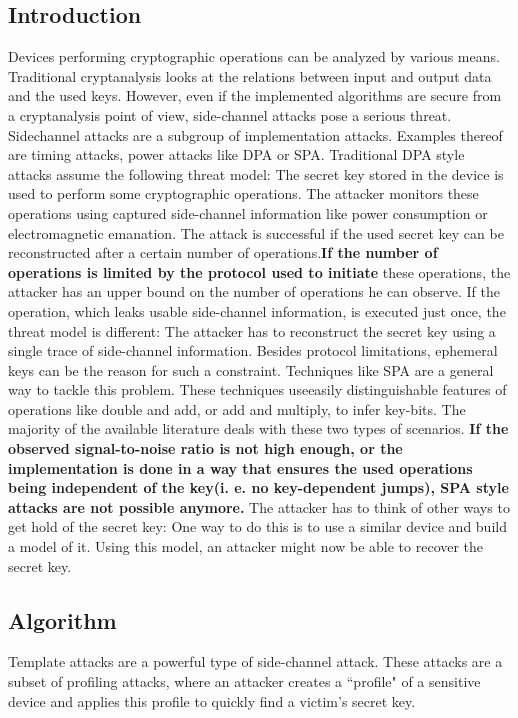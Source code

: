 \subsection{Introduction}
    Devices performing cryptographic operations can be analyzed by various means.
    Traditional cryptanalysis looks at the relations between input and output data and the used keys. However, even if the implemented algorithms are secure from a cryptanalysis point of view, side-channel attacks pose a serious threat. Sidechannel attacks are a subgroup of implementation attacks. Examples thereof are timing attacks, power attacks like DPA or SPA.
    Traditional DPA style attacks assume the following threat model:
    The secret key stored in the device is used to perform some cryptographic operations. The attacker monitors these operations using captured side-channel information like power consumption or electromagnetic emanation. The attack is successful if the used secret key can be reconstructed after a certain number of operations.\textbf{If the number of operations is limited by the protocol used to initiate} these operations, the attacker has an upper bound on the number of operations he can observe. If the operation, which leaks usable side-channel information, is executed just once, the threat model is different: The attacker has to reconstruct the secret
    key using a single trace of side-channel information. Besides protocol limitations, ephemeral keys can be the reason for such a constraint. Techniques like SPA are a general way to tackle this problem. These techniques useeasily distinguishable features of operations like double and add, or add and multiply, to infer key-bits. The majority of the available literature deals with these two types of scenarios. \textbf{If the observed signal-to-noise ratio is not high enough, or the implementation is done in a way that ensures the used operations being independent of the key(i. e. no key-dependent jumps), SPA style attacks are not possible anymore.} The attacker has to think of other ways to get hold of the secret key: One way to do this is to use a similar device and build a model of it. Using this
    model, an attacker might now be able to recover the secret key.
    
\subsection{Algorithm}
    Template attacks are a powerful type of side-channel attack. These attacks are a subset of profiling attacks, where an attacker creates a ``profile" of a sensitive device and applies this profile to quickly find a victim's secret key.
    
